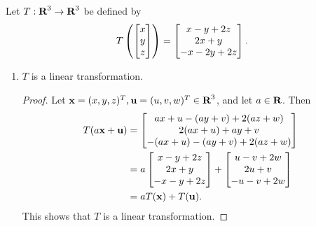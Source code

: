 \documentclass{homework}
\begin{document}
	\maketitle
	
	\question Let $T : \textnormal{\bf R}^3 \to \textnormal{\bf R}^3$ be defined by
	\begin{equation*}
		T\left(\left[\begin{matrix}x\\y\\z\end{matrix}\right]\right) = \left[\begin{matrix}x-y+2z \\ 2x+y \\ -x-2y+2z\end{matrix}\right].
	\end{equation*}
	
	\begin{enumerate}
		\item $T$ is a linear transformation.
		\begin{proof}
			Let $\mathbf{x} = (x,y,z)^T, \mathbf{u} = (u,v,w)^T \in \textnormal{\bf R}^3$, and let $a \in \textnormal{\bf R}$. Then
			\begin{equation*}
				\begin{aligned}
					T(a\mathbf{x} + \mathbf{u}) &= \left[\begin{matrix}ax+u - (ay+v) + 2(az+w) \\ 2(ax+u) + ay+v \\ -(ax+u) - (ay+v) + 2(az+w)\end{matrix}\right]\\
					&= a\left[\begin{matrix}x-y+2z \\ 2x+y \\ -x-y+2z\end{matrix}\right] + \left[\begin{matrix}u -v+2w \\ 2u + v \\ -u-v+2w\end{matrix}\right] \\
					&= aT(\mathbf{x}) + T(\mathbf{u}).
				\end{aligned}
			\end{equation*}
			This shows that $T$ is a linear transformation.
		\end{proof}
		

\end{enumerate}
\end{document}
